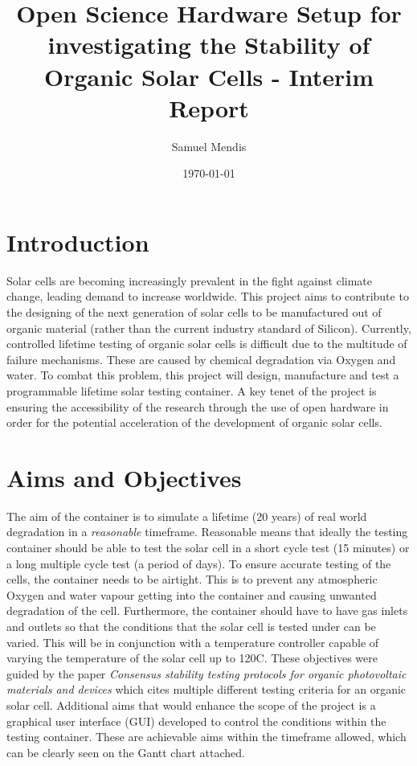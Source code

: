 \documentclass[a4paper,11pt]{article}
\begin{document}
\title{Open Science Hardware Setup for investigating the Stability of Organic Solar Cells - Interim Report}
\author{Samuel Mendis}
\date{\today}
\maketitle
\pagebreak
\section{Introduction}
Solar cells are becoming increasingly prevalent in the fight against climate change\cite[p.~XV]{RN45}, leading demand to increase worldwide. This project aims to contribute to the designing of the next generation of solar cells to be manufactured out of organic material (rather than the current industry standard of Silicon). Currently, controlled lifetime testing of organic solar cells is difficult due to the multitude of failure mechanisms. These are caused by chemical degradation via Oxygen and water\cite[p.~689]{RN38}. To combat this problem, this project will design, manufacture and test a programmable lifetime solar testing container. A key tenet of the project is ensuring the accessibility of the research through the use of open hardware in order for the  potential acceleration of the development of organic solar cells.
\section{Aims and Objectives}
The aim of the container is to simulate a lifetime (20 years) of real world degradation in a \emph{reasonable} timeframe. Reasonable means that ideally the testing container should be able to test the solar cell in a short cycle test (15 minutes) or a long multiple cycle test (a period of days). To ensure accurate testing of the cells, the container needs to be airtight. This is to prevent any atmospheric Oxygen and water vapour getting into the container and causing unwanted degradation of the cell. Furthermore, the container should have to have gas inlets and outlets so that the conditions that the solar cell is tested under can be varied. This will be in conjunction with a temperature controller capable of varying the temperature of the solar cell up to 120\textdegree C. These objectives were guided by the paper \emph{Consensus stability testing protocols for organic photovoltaic materials and devices} \cite[p.~1255-1261]{RN47} which cites multiple different testing criteria for an organic solar cell. Additional aims that would enhance the scope of the project is a graphical user interface (GUI) developed to control the conditions within the testing container. These are achievable aims within the timeframe allowed, which can be clearly seen on the Gantt chart attached. 
\end{document}
